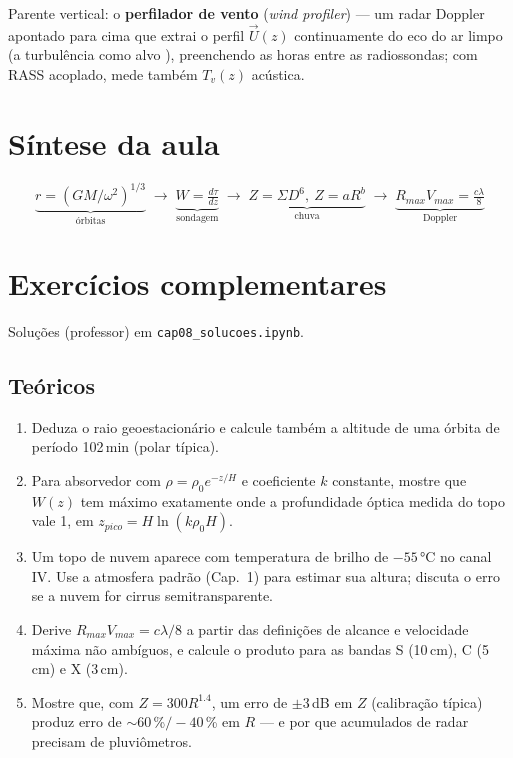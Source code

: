 \documentclass[11pt]{article}
\begin{document}
Parente vertical: o \textbf{perfilador de vento} (\emph{wind
profiler}) — um radar Doppler apontado para cima que extrai o perfil
$\vec U(z)$ continuamente do eco do ar limpo (a turbulência como
alvo ), preenchendo as horas entre as
radiossondas; com RASS acoplado, mede também $T_v(z)$ acústica.

\section{Síntese da aula}

\begin{noquadro}
\[ \underbrace{r=(GM/\omega^2)^{1/3}}_{\text{órbitas}} \;\to\;
   \underbrace{W = \tfrac{d\tau}{dz}}_{\text{sondagem}} \;\to\;
   \underbrace{Z = \Sigma D^6,\ Z=aR^b}_{\text{chuva}} \;\to\;
   \underbrace{R_{max}V_{max} = \tfrac{c\lambda}{8}}_{\text{Doppler}} \]
\end{noquadro}

\section{Exercícios complementares}\label{sec:exercicios}

Soluções (professor) em \texttt{cap08\_solucoes.ipynb}.

\subsection*{Teóricos}

\begin{enumerate}[label=\textbf{T\arabic*.},itemsep=4pt]
  \item Deduza o raio geoestacionário e calcule também a altitude de uma
        órbita de período 102\,min (polar típica).
  \item Para absorvedor com $\rho = \rho_0 e^{-z/H}$ e coeficiente $k$
        constante, mostre que $W(z)$ tem máximo exatamente onde a
        profundidade óptica medida do topo vale 1, em
        $z_{pico} = H\ln(k\rho_0 H)$.
  \item Um topo de nuvem aparece com temperatura de brilho de $-55\,°$C
        no canal IV. Use a atmosfera padrão (Cap.~1) para estimar sua
        altura; discuta o erro se a nuvem for cirrus semitransparente.
  \item Derive $R_{max}V_{max} = c\lambda/8$ a partir das definições de
        alcance e velocidade máxima não ambíguos, e calcule o produto
        para as bandas S (10\,cm), C (5\,cm) e X (3\,cm).
  \item Mostre que, com $Z = 300R^{1.4}$, um erro de $\pm$3\,dB em $Z$
        (calibração típica) produz erro de $\sim$60\,\%$/{-}40$\,\% em
        $R$ — e por que acumulados de radar precisam de pluviômetros.
\end{enumerate}
\end{document}
